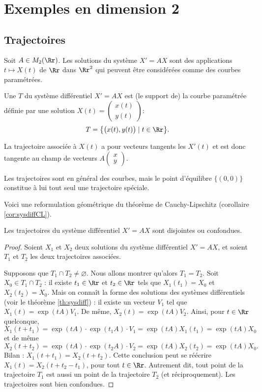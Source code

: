 \documentclass[12pt, class=report,crop=false]{standalone}
\begin{document}
\section{Exemples en dimension 2}


\subsection{Trajectoires}

Soit $A\in M_2(\Rr)$. Les solutions du système $X'=AX$ sont des applications 
$t \mapsto X(t)$ de $\Rr$ dans $\Rr^2$ qui peuvent être
considérées comme des courbes paramétrées. 

Une  $T$ du système différentiel $X'=AX$ est (le support de) la courbe paramétrée 
définie par une solution $X(t) = \left(\begin{smallmatrix}x(t)\\y(t)\end{smallmatrix} \right)$:
$$T =  \big\{ \big( x(t), y(t) \big) \mid t \in \Rr \big\}.$$

La  trajectoire associée à $X(t)$ a pour vecteurs tangents les $X'(t)$ et est  donc tangente
au champ de vecteurs $A \left(\begin{smallmatrix}x\\y\end{smallmatrix} \right)$.

Les trajectoires sont en général des courbes, mais le point d'équilibre $\{(0,0)\}$ constitue à lui tout seul une trajectoire spéciale.

\bigskip

Voici une reformulation géométrique du théorème de Cauchy-Lipschitz (corollaire \ref{cor:sysdiffCL}).
\begin{proposition}
Les trajectoires du système différentiel $X'=AX$ sont disjointes ou confondues. 
\end{proposition} 

\begin{proof}
Soient $X_1$ et $X_2$ deux solutions du système différentiel $X'=AX$, et 
soient $T_1$ et $T_2$ les deux trajectoires associées.

Supposons que $T_1 \cap T_2 \neq \varnothing$. Nous allons montrer qu'alors $T_1=T_2$.
Soit $X_0 \in T_1 \cap T_2$ : 
il existe $t_1\in\Rr$ et $t_2\in\Rr$ tels que 
$X_1(t_1)=X_0$ et $X_2(t_2)=X_0.$
Mais on connaît la forme des solutions des systèmes différentiels (voir le théorème \ref{th:sysdiff}) :
il existe un vecteur $V_1$ tel que $X_1(t)  = \exp(tA)V_1$.
De même, $X_2(t) = \exp(tA)V_2$.
Ainsi, pour $t \in \Rr$ quelconque,
$$X_1(t+t_1) = \exp(tA) \cdot \exp(t_1A) \cdot V_1 = \exp(tA) X_1(t_1) = \exp(tA) X_0$$
et de même
$$X_2(t+t_2) = \exp(tA) \cdot \exp(t_2A) \cdot V_2 = \exp(tA) X_2(t_2) = \exp(tA) X_0.$$
Bilan : $X_1(t+t_1)=X_2(t+t_2)$. Cette conclusion peut se réécrire 
$X_1(t)=X_2(t+t_2-t_1)$, pour tout $t\in \Rr$. Autrement dit, tout point de la trajectoire $T_1$ est aussi un point de la trajectoire $T_2$ (et réciproquement). Les trajectoires sont bien confondues.
\end{proof}
\end{document}
